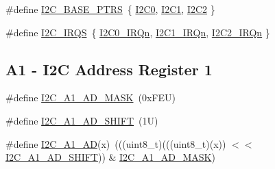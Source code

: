 \begin{DoxyCompactItemize}
\item 
\#define \mbox{\hyperlink{group___i2_c___register___masks_gaee17f364d6d1712b62774e6c33dea554}{I2\+C\+\_\+\+B\+A\+S\+E\+\_\+\+P\+T\+RS}}~\{ \mbox{\hyperlink{group___i2_c___register___masks_ga86abb2e8858d177c04e60c41e9242045}{I2\+C0}}, \mbox{\hyperlink{group___i2_c___register___masks_gab45d257574da6fe1f091cc45b7eda6cc}{I2\+C1}}, \mbox{\hyperlink{group___i2_c___register___masks_gafa60ac20c1921ef1002083bb3e1f5d16}{I2\+C2}} \}
\item 
\#define \mbox{\hyperlink{group___i2_c___register___masks_gaa8773ffc80a322ac3833d4ad1853185a}{I2\+C\+\_\+\+I\+R\+QS}}~\{ \mbox{\hyperlink{group___interrupt__vector__numbers_gga666eb0caeb12ec0e281415592ae89083a0f1945c7372a6de732306ea3801c8e2a}{I2\+C0\+\_\+\+I\+R\+Qn}}, \mbox{\hyperlink{group___interrupt__vector__numbers_gga666eb0caeb12ec0e281415592ae89083af651b1769e03e4653b1a4a7c88132398}{I2\+C1\+\_\+\+I\+R\+Qn}}, \mbox{\hyperlink{group___interrupt__vector__numbers_gga666eb0caeb12ec0e281415592ae89083a0e9ff46d0a6311ca3cc43a71702d638d}{I2\+C2\+\_\+\+I\+R\+Qn}} \}
\end{DoxyCompactItemize}
\subsection*{A1 -\/ I2C Address Register 1}
\begin{DoxyCompactItemize}
\item 
\#define \mbox{\hyperlink{group___i2_c___register___masks_gad90fbd42f33b89ff3296c52700771b1b}{I2\+C\+\_\+\+A1\+\_\+\+A\+D\+\_\+\+M\+A\+SK}}~(0x\+F\+E\+U)
\item 
\#define \mbox{\hyperlink{group___i2_c___register___masks_gaf074658893634b95a9858ee29bbdd88a}{I2\+C\+\_\+\+A1\+\_\+\+A\+D\+\_\+\+S\+H\+I\+FT}}~(1\+U)
\item 
\#define \mbox{\hyperlink{group___i2_c___register___masks_ga5248771248d1964b566ca3de1cadf6a3}{I2\+C\+\_\+\+A1\+\_\+\+AD}}(x)~(((uint8\+\_\+t)(((uint8\+\_\+t)(x)) $<$$<$ \mbox{\hyperlink{group___i2_c___register___masks_gaf074658893634b95a9858ee29bbdd88a}{I2\+C\+\_\+\+A1\+\_\+\+A\+D\+\_\+\+S\+H\+I\+FT}})) \& \mbox{\hyperlink{group___i2_c___register___masks_gad90fbd42f33b89ff3296c52700771b1b}{I2\+C\+\_\+\+A1\+\_\+\+A\+D\+\_\+\+M\+A\+SK}})
\end{DoxyCompactItemize}
